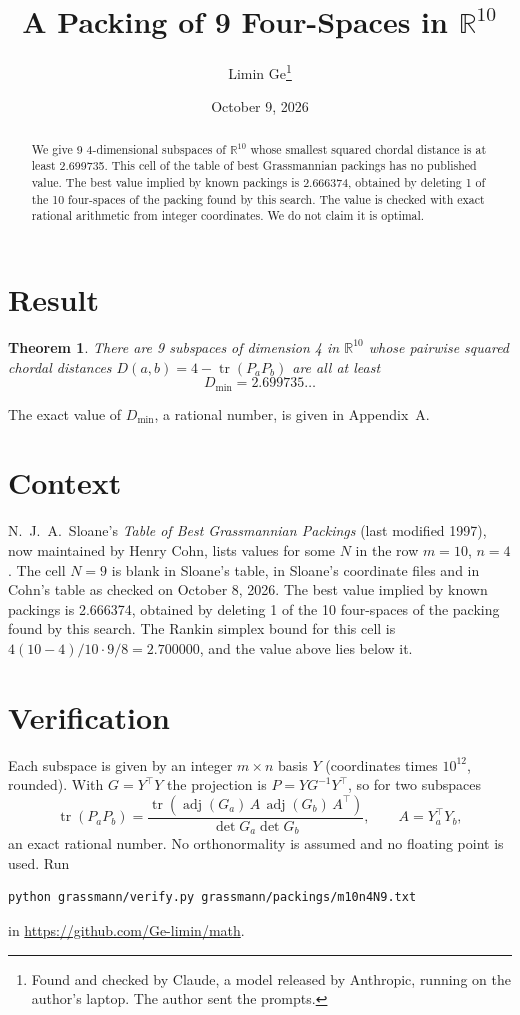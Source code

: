 \documentclass[11pt,a4paper]{article}
\title{A Packing of 9 Four-Spaces in $\mathbb{R}^{10}$}
\author{Limin Ge\thanks{Found and checked by Claude, a model released by Anthropic, running on the author's laptop. The author sent the prompts.}}
\date{October 9, 2026}
\newtheorem*{theorem}{Theorem}
\begin{document}
\maketitle
\begin{abstract}
We give 9 4-dimensional subspaces of $\mathbb{R}^{10}$ whose smallest squared chordal distance is at least 2.699735. This cell of the table of best Grassmannian packings has no published value. The best value implied by known packings is 2.666374, obtained by deleting 1 of the 10 four-spaces of the packing found by this search. The value is checked with exact rational arithmetic from integer coordinates. We do not claim it is optimal.
\end{abstract}

\section{Result}
\begin{theorem}
There are 9 subspaces of dimension 4 in $\mathbb{R}^{10}$ whose pairwise squared chordal distances $D(a,b) = 4 - \operatorname{tr}(P_aP_b)$ are all at least
\[ D_{\min} = 2.699735\ldots \]
\end{theorem}
The exact value of $D_{\min}$, a rational number, is given in Appendix~A.


\section{Context}
N.~J.~A.~Sloane's \emph{Table of Best Grassmannian Packings} (last modified 1997), now maintained by Henry Cohn, lists values for some $N$ in the row $m=10$, $n=4$. The cell $N=9$ is blank in Sloane's table, in Sloane's coordinate files and in Cohn's table as checked on October 8, 2026. The best value implied by known packings is 2.666374, obtained by deleting 1 of the 10 four-spaces of the packing found by this search. The Rankin simplex bound for this cell is $4(10-4)/10\cdot 9/8 = 2.700000$, and the value above lies below it.


\section{Verification}
Each subspace is given by an integer $m\times n$ basis $Y$ (coordinates times $10^{12}$, rounded). With $G=Y^\top Y$ the projection is $P=YG^{-1}Y^\top$, so for two subspaces
\[ \operatorname{tr}(P_aP_b)=\frac{\operatorname{tr}(\operatorname{adj}(G_a)\,A\,\operatorname{adj}(G_b)\,A^\top)}{\det G_a\det G_b},\qquad A=Y_a^\top Y_b, \]
an exact rational number. No orthonormality is assumed and no floating point is used. Run
\begin{verbatim}
python grassmann/verify.py grassmann/packings/m10n4N9.txt
\end{verbatim}
in \url{https://github.com/Ge-limin/math}.
\end{document}
